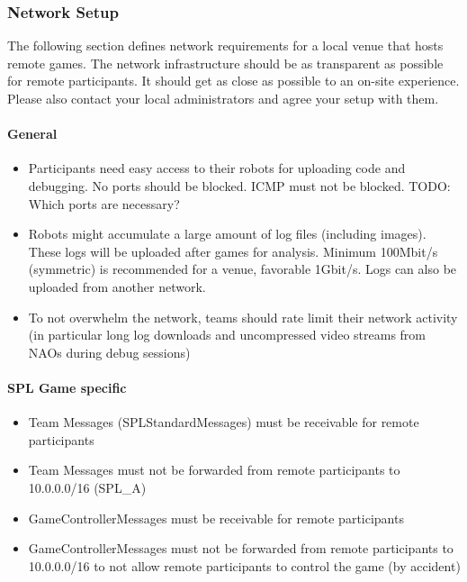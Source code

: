 \subsubsection{Network Setup}
The following section defines network requirements for a local venue that hosts remote games. The network infrastructure should be as transparent as possible for remote participants. It should get as close as possible to an on-site experience. Please also contact your local administrators and agree your setup with them.

\paragraph{General}

\begin{itemize}
    \item Participants need easy access to their robots for uploading code and debugging. No ports should be blocked. ICMP must not be blocked. TODO: Which ports are necessary?
    \item Robots might accumulate a large amount of log files (including images). These logs will be uploaded after games for analysis. Minimum 100Mbit/s (symmetric) is recommended for a venue, favorable 1Gbit/s. Logs can also be uploaded from another network.
    \item To not overwhelm the network, teams should rate limit their network activity (in particular long log downloads and uncompressed video streams from NAOs during debug sessions)
\end{itemize}

\paragraph{SPL Game specific}

\begin{itemize}
    \item Team Messages (SPLStandardMessages) must be receivable for remote participants
    \item Team Messages must not be forwarded from remote participants to 10.0.0.0/16 (SPL\_A)
    \item GameControllerMessages must be receivable for remote participants
    \item GameControllerMessages must not be forwarded from remote participants to 10.0.0.0/16 to not allow remote participants to control the game (by accident)
\end{itemize}


